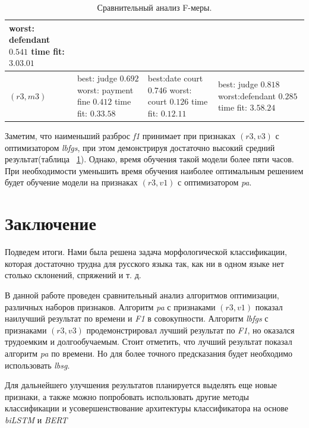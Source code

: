 \documentclass{csmathnotes}
\begin{document}
\begin{table}[!h]
\begin{center}
\begin{tabular}{|p{3.1cm}|p{2.5cm}|p{2.5cm}|p{2.5cm}|}
			  worst: \newline defendant  $0.541$\newline
			  time fit:\newline $3.03.01$\\
			\hline
			$(r3, m3)$
			& best: \newline judge $0.692$ \newline
			worst: \newline payment fine $0.412$ \newline
			time fit: \newline  $0.33.58$
			& best:\newline   date court   $0.746$ \newline
			 worst: \newline court $0.126$ \newline
			 time fit: \newline $0.12.11$
			& best: \newline   judge $0.818$ \newline
			  worst:\newline defendant $0.285$ \newline 
			  time fit: \newline $3.58.24$\\
			\hline
		\end{tabular}
	\end{center}
	\caption{\label{tabl:table2}Сравнительный анализ F-меры.}
\end{table}

Заметим, что наименьший разброс \emph{f1}  принимает при признаках $(r3,v3)$ с оптимизатором \emph{lbfgs}, при этом демонстрируя достаточно высокий средний результат(таблица ~\ref{tabl:table2}). Однако, время обучения такой модели более пяти часов. При необходимости уменьшить время обучения наиболее оптимальным решением будет обучение модели на признаках $(r3,v1)$ с оптимизатором \emph{pa}.

\section*{Заключение}
Подведем итоги. Нами была решена задача морфологической классификации, которая достаточно трудна для русского языка так, как ни в одном языке нет столько склонений, спряжений и т. д. 


В данной работе проведен сравнительный анализ алгоритмов оптимизации, различных наборов признаков. Алгоритм \emph{pa} с признаками $(r3, v1)$ показал наилучший результат по времени и \emph{F1}  в совокупности. Алгоритм \emph{lbfgs}  с признаками $(r3, v3)$ продемонстрировал лучший результат по \emph{F1}, но оказался трудоемким и долгообучаемым. Стоит отметить, что лучший результат показал алгоритм \emph{pa} по времени. Но для более точного предсказания будет необходимо использовать \emph{lbsg}.


Для дальнейшего улучшения результатов планируется выделять еще новые признаки, а также можно попробовать использовать другие методы классификации и усовершенствование архитектуры классификатора на основе \emph{biLSTM} и \emph{BERT}

\printbibliography
\end{document}
